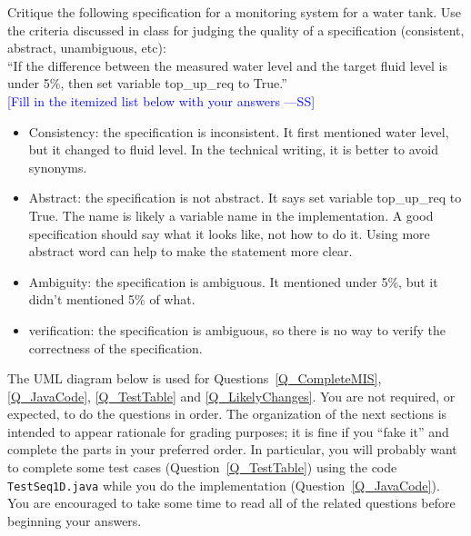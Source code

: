 \documentclass[12pt,fleqn]{examtst}
\newcommand{\authornote}[3]{\textcolor{#1}{[#3 ---#2]}}
\newcommand{\authornote}[3]{}
\newcommand{\wss}[1]{\authornote{blue}{SS}{#1}}
\begin{document}
\noindent
\begin{minipage}{\textwidth}

Critique the following specification for a monitoring system for a water tank.
Use the criteria discussed in class for judging the quality of a specification
(consistent, abstract, unambiguous, etc):\\

``If the difference between the measured water level and the target fluid level is
under 5\%, then set variable top\_up\_req to True.''
~\\

\noindent \wss{Fill in the itemized list below with your answers}

\begin{itemize}
\item Consistency: the specification is inconsistent. It first mentioned water level, but it changed to fluid level. In the 
technical writing, it is better to avoid synonyms. 
\item Abstract: the specification is not abstract. It says set variable top\_up\_req to True. The name is likely a variable 
name in the implementation. A good specification should say what it looks like, not how to do it. Using more abstract word 
can help to make the statement more clear.
\item Ambiguity: the specification is ambiguous. It mentioned under 5\%, but it didn't mentioned 5\% of what.
\item verification: the specification is ambiguous, so there is no way to verify the correctness of the specification.
\end{itemize}

\end{minipage}


\newpage

\noindent The UML diagram below is used for Questions~\ref{Q_CompleteMIS},
\ref{Q_JavaCode}, \ref{Q_TestTable} and \ref{Q_LikelyChanges}.  You are not
required, or expected, to do the questions in order.  The organization of the
next sections is intended to appear rationale for grading purposes; it is fine
if you ``fake it'' and complete the parts in your preferred order.  In
particular, you will probably want to complete some test cases
(Question~\ref{Q_TestTable}) using the code \texttt{TestSeq1D.java} while you do
the implementation (Question~\ref{Q_JavaCode}).  You are encouraged to take some
time to read all of the related questions before beginning your answers.
\end{document}
